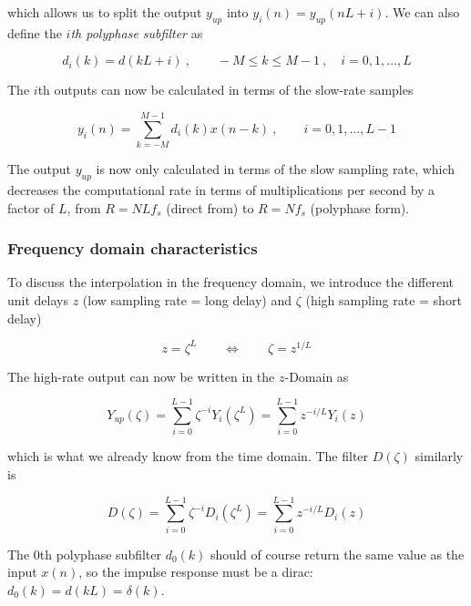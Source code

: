 which allows us to split the output $y_{up}$ into $y_i(n)=y_{up}(nL+i)$. 
We can also define the \emph{$i$th polyphase subfilter} as

\begin{equation*}
	d_i(k) = d(kL+i) \:,\qquad -M \leq k \leq M-1 \:,\quad i=0,1,\ldots,L
\end{equation*}

The $i$th outputs can now be calculated in terms of the slow-rate samples

\begin{equation*}
	y_i(n) = \sum\limits_{k=-M}^{M-1}d_i(k) x(n-k) \:,\qquad i=0,1,\ldots,L-1
\end{equation*}

The output $y_{up}$ is now only calculated in terms of the slow sampling rate,
which decreases the computational rate in terms of multiplications per second by
a factor of $L$, from $R = NLf_s$ (direct from) to $R = Nf_s$ (polyphase form). 


\subsubsection{Frequency domain characteristics}
To discuss the interpolation in the frequency domain, we introduce the different
unit delays $z$ (low sampling rate = long delay) and $\zeta$ 
(high sampling rate = short delay)

\begin{equation*}
	z = \zeta^L \qquad \Leftrightarrow \qquad \zeta = z^{1/L}
\end{equation*}

The high-rate output can now be written in the $z$-Domain as

\begin{equation*}
	Y_{up}(\zeta) = \sum\limits_{i=0}^{L-1} \zeta^{-i} Y_i(\zeta^L)
	= \sum\limits_{i=0}^{L-1} z^{-i/L} Y_i(z)
\end{equation*}

which is what we already know from the time domain. The filter $D(\zeta)$
similarly is

\begin{equation*}
	D(\zeta) = \sum\limits_{i=0}^{L-1} \zeta^{-i} D_i(\zeta^L)
	= \sum\limits_{i=0}^{L-1} z^{-i/L} D_i(z)
\end{equation*}

The 0th polyphase subfilter $d_0(k)$ should of course return the same value as
the input $x(n)$, so the impulse response must be a dirac: 
$d_0(k) = d(kL) = \delta(k)$. \\

